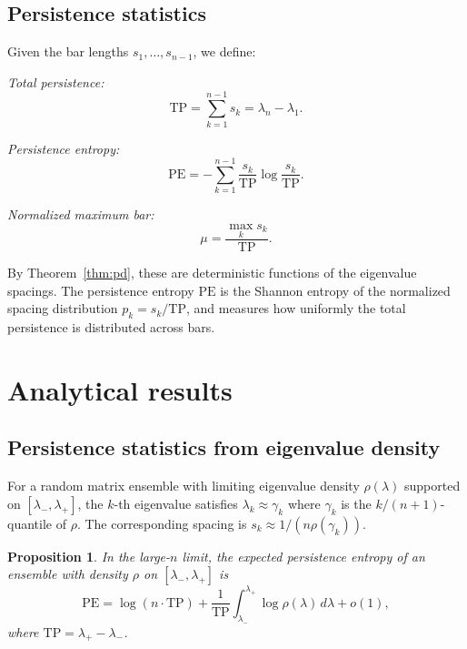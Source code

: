 \documentclass[aps,pre,twocolumn,superscriptaddress,showpacs]{revtex4-2}
\newtheorem{proposition}[theorem]{Proposition}
\begin{document}
\subsection{Persistence statistics}
\label{sec:stats}

Given the bar lengths $s_1, \ldots, s_{n-1}$, we define:

\textit{Total persistence:}
\begin{equation}
\mathrm{TP} = \sum_{k=1}^{n-1} s_k = \lambda_n - \lambda_1.
\label{eq:tp}
\end{equation}

\textit{Persistence entropy:}
\begin{equation}
\mathrm{PE} = -\sum_{k=1}^{n-1} \frac{s_k}{\mathrm{TP}} \log \frac{s_k}{\mathrm{TP}}.
\label{eq:pe}
\end{equation}

\textit{Normalized maximum bar:}
\begin{equation}
\mu = \frac{\max_k s_k}{\mathrm{TP}}.
\label{eq:mu}
\end{equation}

By Theorem~\ref{thm:pd}, these are deterministic functions of the eigenvalue spacings. The persistence entropy $\mathrm{PE}$ is the Shannon entropy of the normalized spacing distribution $p_k = s_k / \mathrm{TP}$, and measures how uniformly the total persistence is distributed across bars.

\section{Analytical results}
\label{sec:analytical}

\subsection{Persistence statistics from eigenvalue density}

For a random matrix ensemble with limiting eigenvalue density $\rho(\lambda)$ supported on $[\lambda_-, \lambda_+]$, the $k$-th eigenvalue satisfies $\lambda_k \approx \gamma_k$ where $\gamma_k$ is the $k/(n+1)$-quantile of $\rho$. The corresponding spacing is $s_k \approx 1/(n\rho(\gamma_k))$.

\begin{proposition}
\label{prop:pe_formula}
In the large-$n$ limit, the expected persistence entropy of an ensemble with density $\rho$ on $[\lambda_-, \lambda_+]$ is
\begin{equation}
\mathrm{PE} = \log(n \cdot \mathrm{TP}) + \frac{1}{\mathrm{TP}} \int_{\lambda_-}^{\lambda_+} \log \rho(\lambda)\, d\lambda + o(1),
\label{eq:pe_general}
\end{equation}
where $\mathrm{TP} = \lambda_+ - \lambda_-$.
\end{proposition}
\end{document}
